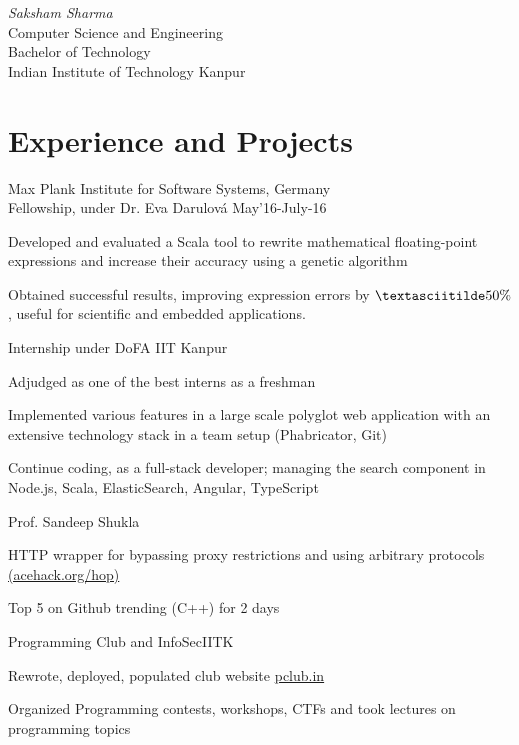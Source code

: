 \documentclass{tccv}
\begin{document}
{ \textit{Saksham \textcolor{myred}{Sharma}}}
\medskip\\
\large{Computer Science and Engineering}\\
\large{Bachelor of Technology}\\
{Indian Institute of Technology Kanpur}

\vspace{-0.5cm}
\section{Experience and Projects}
\vspace{-0.1cm}
\begin{experience}

  {Max Plank Institute for Software Systems, \small{Germany}\\
  Fellowship, under Dr. Eva Darulová \hfill May'16-July-16}
  {
  \item Developed and evaluated a Scala tool to rewrite
    mathematical floating-point expressions and increase their
    accuracy using a genetic algorithm
  \item Obtained successful results, improving expression errors by
    $\textasciitilde50\%$, useful for scientific and embedded
    applications.
  }

  {Internship under DoFA IIT Kanpur}
  {
  \item Adjudged as one of the best interns as a freshman
  \item Implemented various features in a large scale polyglot web
    application with an extensive technology stack in a team setup
    (Phabricator, Git)
  \item Continue coding, as a full-stack developer;
    managing the search component in Node.js, Scala, ElasticSearch,
    Angular, TypeScript
  }

  {Prof. Sandeep Shukla}
  {
  \item HTTP wrapper for bypassing proxy restrictions and using
    arbitrary protocols \href{http://acehack.org/hop}{(acehack.org/hop)}
  \item Top 5 on Github trending (C++) for 2 days
  }

  {Programming Club and InfoSecIITK}
  {
  \item Rewrote, deployed, populated club website \href{http://pclub.in}{pclub.in}
  \item Organized Programming contests, workshops, CTFs and took
    lectures on programming topics
  }


\end{experience}
\end{document}
